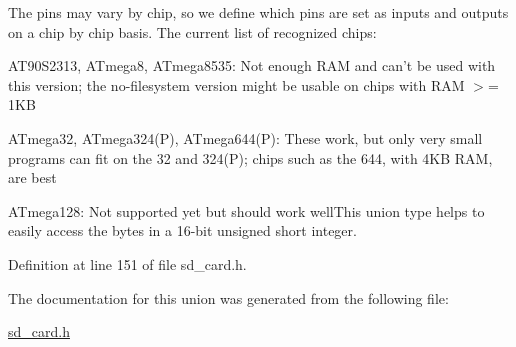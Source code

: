 The pins may vary by chip, so we define which pins are set as inputs and outputs on a chip by chip basis. The current list of recognized chips\-: \begin{DoxyItemize}
\item A\-T90\-S2313, A\-Tmega8, A\-Tmega8535\-: Not enough R\-A\-M and can't be used with this version; the no-\/filesystem version might be usable on chips with R\-A\-M $>$= 1\-K\-B \item A\-Tmega32, A\-Tmega324(\-P), A\-Tmega644(\-P)\-: These work, but only very small programs can fit on the 32 and 324(P); chips such as the 644, with 4\-K\-B R\-A\-M, are best \item A\-Tmega128\-: Not supported yet but should work well\-This union type helps to easily access the bytes in a 16-\/bit unsigned short integer. \end{DoxyItemize}


Definition at line 151 of file sd\-\_\-card.\-h.



The documentation for this union was generated from the following file\-:\begin{DoxyCompactItemize}
\item 
\hyperlink{sd__card_8h}{sd\-\_\-card.\-h}\end{DoxyCompactItemize}
